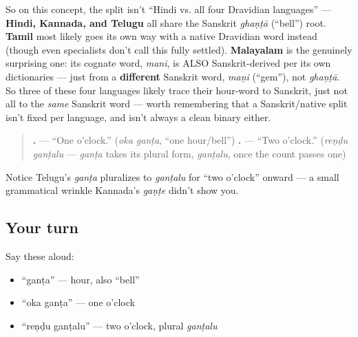 \begin{culture}
So on this concept, the split isn't \textquotedblleft{}Hindi vs. all four Dravidian languages\textquotedblright{} — \textbf{Hindi, Kannada, and Telugu} all share the Sanskrit \emph{ghaṇṭā} (\textquotedblleft{}bell\textquotedblright{}) root. \textbf{Tamil} most likely goes its own way with a native Dravidian word instead (though even specialists don't call this fully settled). \textbf{Malayalam} is the genuinely surprising one: its cognate word, \emph{mani}, is ALSO Sanskrit-derived per its own dictionaries — just from a \textbf{different} Sanskrit word, \emph{maṇi} (\textquotedblleft{}gem\textquotedblright{}), not \emph{ghaṇṭā}. So three of these four languages likely trace their hour-word to Sanskrit, just not all to the \emph{same} Sanskrit word — worth remembering that a Sanskrit/native split isn't fixed per language, and isn't always a clean binary either.
\end{culture}

\begin{grammarlens}[title={Grammar Lens: telling the time}]
\begin{quote}
\textbf{ .} — \textquotedblleft{}One o'clock.\textquotedblright{} (\emph{oka ganṭa}, \textquotedblleft{}one hour/bell\textquotedblright{}) \textbf{ .} — \textquotedblleft{}Two o'clock.\textquotedblright{} (\emph{reṇḍu ganṭalu} — \emph{ganṭa} takes its plural form, \emph{ganṭalu}, once the count passes one)
\end{quote}

Notice Telugu's \emph{ganṭa} pluralizes to \emph{ganṭalu} for \textquotedblleft{}two o'clock\textquotedblright{} onward — a small grammatical wrinkle Kannada's \emph{gaṇṭe} didn't show you.
\end{grammarlens}

\subsection*{Your turn}
Say these aloud:

\begin{itemize}
\raggedright
  \item \textquotedblleft{}ganṭa\textquotedblright{} — hour, also \textquotedblleft{}bell\textquotedblright{}
  \item \textquotedblleft{}oka ganṭa\textquotedblright{} — one o'clock
  \item \textquotedblleft{}reṇḍu ganṭalu\textquotedblright{} — two o'clock, plural \emph{ganṭalu}
\end{itemize}

